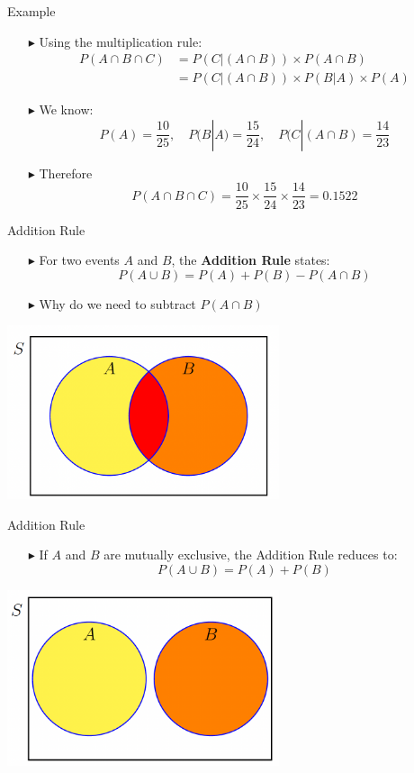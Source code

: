 \documentclass[12pt]{beamer}
\begin{document}
\begin{frame}{Example}
	\begin{itemize}
		\item[\color{blue}$\blacktriangleright$] Using the multiplication rule:
		\begin{align*}
		P(A\cap B\cap C)&=P(C|(A\cap B))\times P(A\cap B)\\
		&=P(C|(A\cap B))\times P(B|A)\times P(A)
	\end{align*}
		
		\item[\color{blue}$\blacktriangleright$] We know:
		$$P(A)=\frac{10}{25},\quad P(B|A)=\frac{15}{24},\quad P(C|(A\cap B)=\frac{14}{23}$$
		\item[\color{blue}$\blacktriangleright$] Therefore
		$$P(A\cap B\cap C)=\frac{10}{25}\times\frac{15}{24}\times\frac{14}{23}=0.1522$$
	\end{itemize}
\end{frame}
\begin{frame}{Addition Rule}
	\begin{itemize}
		\item[\color{blue}$\blacktriangleright$] For two events $A$ and $B$, the {\bf Addition Rule} states:
		$$P(A\cup B)=P(A)+P(B)-P(A\cap B)$$
		
		\item[\color{blue}$\blacktriangleright$] Why do we need to subtract $P(A\cap B)$
	\end{itemize}
		\centering
	\includegraphics[width=8cm]{addition.png}
\end{frame}
\begin{frame}{Addition Rule}
	\begin{itemize}
		\item[\color{blue}$\blacktriangleright$] If $A$ and $B$ are mutually exclusive, the Addition Rule reduces to:
		$$P(A\cup B)=P(A)+P(B)$$
	\end{itemize}
	\centering
	\includegraphics[width=8cm]{reduce.png}
\end{frame}
\end{document}

